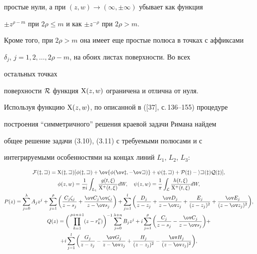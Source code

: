 простые нули, а при $(z,w)\to(\infty,\pm\infty)$ убывает как функция 


$\pm z^{\rho-m}$ при $2\rho\le m$ и как $\pm z^{-\rho}$ при $2\rho>m$. 


Кроме того, при $2\rho>m$ она имеет еще простые полюса в точках с аффиксами 


$\delta_j$, $j=1,2,\dotsc,2\rho-m$, на обоих листах поверхности. Во всех 


остальных точках 


поверхности $\cal R$ функция $\mathrm X(z,w)$ ограничена и отлична от нуля. 


 


Используя функцию $\mathrm X(z,w)$, по описанной в ([37], с.\,136--155) процедуре 


построения ``симметричного'' решения краевой задачи Римана найдем 


общее решение задачи (3.10), (3.11) с требуемыми полюсами и с 


интегрируемыми особенностями на концах линий $L_1$, $L_2$, $L_3$: 


\begin{gather} 


\cal F(z,w)=\X(z,w)[\phi(z,w)+\ov{\phi(\ov z,-\ov w)}+ 


\psi(z,w)+P(z)-i w(z)Q(z)],\\ 


%


\phi(z,w)=\frac{1}{\pi i}\int_{L_1}\frac{g(t,\xi)}{\X^+(t,\xi)}dW,\quad 


\psi(z,w)=\frac{1}{\pi}\int_{\cal L}\frac{h(t,\xi)}{\X^+(t,\xi)} 


dW,\notag \\ 


%


P(z)=\sum^\lambda_{j=0}A_j z^j+\sum^\rho_{j=1}\bigg( 


\frac{C_j\zeta_j}{z-s_j}+\frac{\ov C_j\ov\zeta_j}{z-\ov s_j}\bigg)+ 


\sum^l_{j=1}\bigg(\frac{D_j}{z-z_j}+\frac{\ov D_j}{z-\ov z_j}+ 


\frac{E_j}{(z-z_j)^2}+\frac{\ov E_j}{(z-\ov z_j)^2}\bigg),\notag \\ 


%


Q(z)=\bigg(\prod^{\rho+n+1}_{k=1}(z-r''_k) \bigg)^{-1} 


\sum^{\lambda+n}_{j=0}B_j z^j+i\sum^\rho_{j=1}\bigg( 


\frac{C_j}{z-s_j}-\frac{\ov C_j}{z-\ov s_j}\bigg)+\notag \\ 


+i\sum^l_{j=1}\bigg(\frac{G_j}{z-z_j}-\frac{\ov G_j}{z-\ov z_j}+ 


\frac{H_j}{(z-z_j)^2}-\frac{\ov H_j}{(z-\ov z_j)^2}\bigg),\notag 


\end{gather} 


